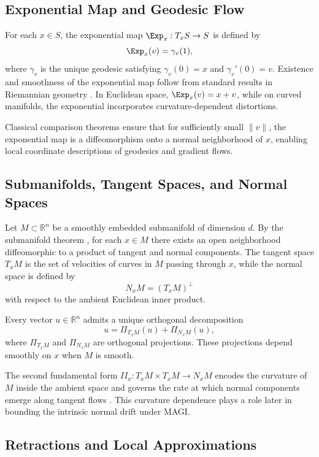 \documentclass[12pt]{article}
\begin{document}
\subsection*{Exponential Map and Geodesic Flow}

For each $x \in S$, the exponential map $\Exp_x : T_xS \to S$ is defined by
\[
\Exp_x(v) = \gamma_v(1),
\]
where $\gamma_v$ is the unique geodesic satisfying $\gamma_v(0)=x$ and $\gamma_v'(0)=v$. Existence and smoothness of the exponential map follow from standard results in Riemannian geometry \citep{CheegerEbin1975,LeeRiemannian2018}. In Euclidean space, $\Exp_x(v)=x+v$, while on curved manifolds, the exponential incorporates curvature-dependent distortions.

Classical comparison theorems \citep{CheegerEbin1975,Sakai1996} ensure that for sufficiently small $\|v\|$, the exponential map is a diffeomorphism onto a normal neighborhood of $x$, enabling local coordinate descriptions of geodesics and gradient flows.

\subsection*{Submanifolds, Tangent Spaces, and Normal Spaces}

Let $M \subset \mathbb{R}^n$ be a smoothly embedded submanifold of dimension $d$. By the submanifold theorem \citep{doCarmoRiemannian1992,GuilleminPollack1974}, for each $x \in M$ there exists an open neighborhood diffeomorphic to a product of tangent and normal components. The tangent space $T_xM$ is the set of velocities of curves in $M$ passing through $x$, while the normal space is defined by
\[
N_xM = (T_xM)^\perp
\]
with respect to the ambient Euclidean inner product.

Every vector $u \in \mathbb{R}^n$ admits a unique orthogonal decomposition
\[
u = \Pi_{T_xM}(u) + \Pi_{N_xM}(u),
\]
where $\Pi_{T_xM}$ and $\Pi_{N_xM}$ are orthogonal projections. These projections depend smoothly on $x$ when $M$ is smooth.

The second fundamental form $II_x : T_xM \times T_xM \to N_xM$ encodes the curvature of $M$ inside the ambient space and governs the rate at which normal components emerge along tangent flows \citep{doCarmoRiemannian1992}. This curvature dependence plays a role later in bounding the intrinsic normal drift under MAGI.

\subsection*{Retractions and Local Approximations}
\end{document}
